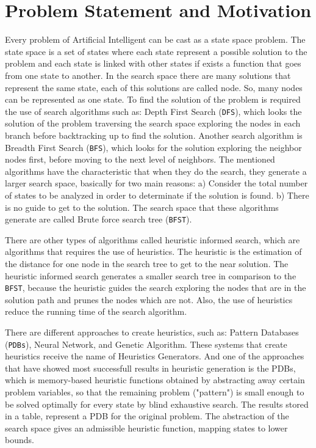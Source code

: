 \section{Problem Statement and Motivation}
\noindent
Every problem of Artificial Intelligent can be cast as a state space problem. The state space is a set of states where each state represent a possible solution to the problem and each state is linked with other states if exists a function that goes from one state to another. In the search space there are many solutions that represent the same state, each of this solutions are called node. So, many nodes can be represented as one state. To find the solution of the problem is required the use of search algorithms such as: Depth First Search (\texttt{DFS}), which looks the solution of the problem traversing the search space exploring the nodes in each branch before backtracking up to find the solution. Another search algorithm is Breadth First Search (\texttt{BFS}), which looks for the solution exploring the neighbor nodes first, before moving to the next level of neighbors. The mentioned algorithms have the characteristic that when they do the search, they generate a larger search space, basically for two main reasons: a) Consider the total number of states to be analyzed in order to determinate if the solution is found. b) There is no guide to get to the solution. The search space that these algorithms generate are called Brute force search tree (\texttt{BFST}).

There are other types of algorithms called heuristic informed search, which are algorithms that requires the use of heuristics. The heuristic is the estimation of the distance for one node in the search tree to get to the near solution. The heuristic informed search generates a smaller search tree in comparison to the \texttt{BFST}, because the heuristic guides the search exploring the nodes that are in the solution path and prunes the nodes which are not. Also, the use of heuristics reduce the running time of the search algorithm.

There are different approaches to create heuristics, such as: Pattern Databases (\texttt{PDBs}), Neural Network, and Genetic Algorithm. These systems that create heuristics receive the name of Heuristics Generators. And one of the approaches that have showed most successfull results in heuristic generation is the PDBs, which is memory-based heuristic functions obtained by abstracting away certain problem variables, so that the remaining problem ("pattern") is small enough to be solved optimally for every state by blind exhaustive search. The results stored in a table, represent a PDB for the original problem. The abstraction of the search space gives an admissible heuristic function, mapping states to lower bounds.

